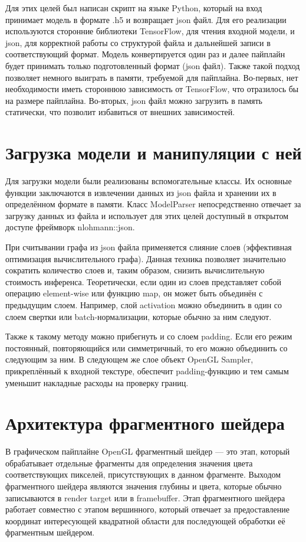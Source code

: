 \documentclass[a4paper,14pt]{extreport}
\begin{document}
            Для этих целей был написан скрипт на языке Python, который на вход принимает модель в формате .h5 и возвращает json файл. Для его реализации используются сторонние библиотеки TensorFlow, для чтения входной модели, и json, для корректной работы со структурой файла и дальнейшей записи в соответствующий формат. Модель конвертируется один раз и далее пайплайн будет принимать только подготовленный формат (json файл). Также такой подход позволяет немного выиграть в памяти, требуемой для пайплайна. Во-первых, нет необходимости иметь стороннюю зависимость от TensorFlow, что отразилось бы на размере пайплайна. Во-вторых, json файл можно загрузить в память статически, что позволит избавиться от внешних зависимостей.
            
        \section{Загрузка модели и манипуляции с ней}
            Для загрузки модели были реализованы вспомогательные классы. Их основные функции заключаются в извлечении данных из json файла и хранении их в определённом формате в памяти. Класс ModelParser непосредственно отвечает за загрузку данных из файла и использует для этих целей доступный в открытом доступе фреймворк nlohmann::json. 

            При считывании графа из json файла применяется слияние слоев (эффективная оптимизация вычислительного графа). Данная техника позволяет значительно сократить количество слоев и, таким образом, снизить вычислительную стоимость инференса. Теоретически, если один из слоев представляет собой операцию element-wise или функцию map, он может быть объединён с предыдущим слоем. Например, слой activation можно объединить в один со слоем свертки или batch-нормализации, которые обычно за ним следуют.
            
            Также к такому методу можно прибегнуть и со слоем padding. Если его режим постоянный, повторяющийся или симметричный, то его можно объединить со следующим за ним. В следующем же слое объект OpenGL Sampler, прикреплённый к входной текстуре, обеспечит padding-функцию и тем самым уменьшит накладные расходы на проверку границ.

        \section{Архитектура фрагментного шейдера}
            В графическом пайплайне OpenGL фрагментный шейдер — это этап, который обрабатывает отдельные фрагменты для определения значения цвета соответствующих пикселей, присутствующих в данном фрагменте. Выходом фрагментного шейдера являются значения глубины и цвета, которые обычно записываются в render target или в framebuffer. Этап фрагментного шейдера работает совместно с этапом вершинного, который отвечает за предоставление координат интересующей квадратной области для последующей обработки её фрагментным шейдером.
\end{document}
